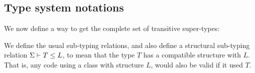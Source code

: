 \subsection{Type system notations}
\begin{comment}
Here we define some auxiliary type-system related notations.

A `valid' type is one that can be used as a target in a redirect map. It must already be fully flattened and typed, and cannot refer to a private class, unless it is an outer class, or directly within one. (See Section \ref{?} for the typing rules of form $\S \vdash T : \Ok$.)

\begin{defs}
	\defip{\S\op{validType}{T}}{\S \vdash T : \Ok \text{ and }\S\op{accessible}{T}}{}
	\defis
	
	\defit{(\State{\Dz}{T\.Cs})\op{accessible}{T}}{an outer class}
	\defit{(\State{\Dz}{T\.Cs})\op{accessible}{T\.C}}{nested within an outer class}
	\defit{(\State)\op{accessible}{T'\.C} \text{ if } (\State)\op{accessible}{T'} \text{ and } \Dz(T')=\cl{\_}{\_}{\cd{C}{E}, \_}}{public class}
\end{defs}
\end{comment}

We now define a way to get the complete set of transitive super-types:

\begin{defs}
\end{defs}

We define the usual sub-typing relations, and also define a structural sub-typing relation $\S \vdash T \leq L$, to mean that the type $T$ has a compatible structure with $L$. That is, any code using a class with structure $L$, would also be valid if it used $T$.

\begin{defs}
{}
\end{defs}

